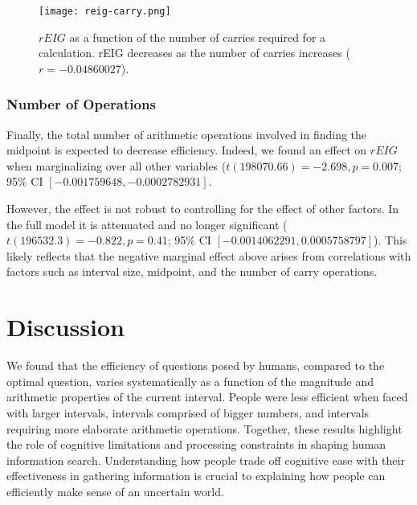 \documentclass[10pt,letterpaper]{article}
\newcommand{\nums}[1]{\num[scientific-notation = true]{#1}}
\begin{document}
\begin{figure}[h]
\begin{center}
    \texttt{[image: reig-carry.png]}
\end{center}
    \vspace{-6mm}
    \caption{$rEIG$ as a function of the number of carries required for a calculation. rEIG decreases as the number of carries increases ($r = \num{-0.04860027}$).
}
    \label{fig:reig-carry}
\vspace{-2mm}
\end{figure}

\subsubsection{Number of Operations}
Finally, the total number of arithmetic operations involved in finding the midpoint is expected to decrease efficiency. Indeed, we found an effect on $rEIG$ when marginalizing over all other variables ($t(198070.66) = -2.698, p=0.007$; 95\% CI $[\nums{-0.001759648}, \nums{-0.0002782931}]$.

However, the effect is not robust to controlling for the effect of other factors. In the full model it is attenuated and no longer significant ($t(196532.3) = -0.822, p=0.41$; 95\% CI $[\nums{-0.0014062291}, \nums{0.0005758797}]$). 
This likely reflects that the negative marginal effect above arises from correlations with factors such as interval size, midpoint, and the number of carry operations. 



\section{Discussion}
We found that the efficiency of questions posed by humans, compared to the optimal question, varies systematically as a function of the magnitude and arithmetic properties of the current interval. People were less efficient when faced with larger intervals, intervals comprised of bigger numbers, and intervals requiring more elaborate arithmetic operations. 
Together, these results highlight the role of cognitive limitations and processing constraints in shaping human information search. Understanding how people trade off cognitive ease with their effectiveness in gathering information is crucial to explaining how people can efficiently make sense of an uncertain world. 
\end{document}
